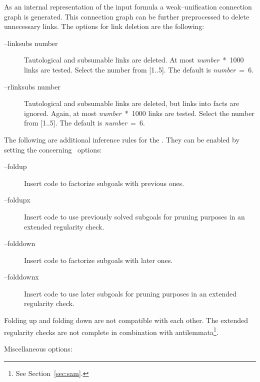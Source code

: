 As an internal representation of the input formula a
weak--unification connection graph  is generated. This
connection graph can be further preprocessed to delete
unnecessary links. The options for link deletion are the
following: 

\begin{description}
      \item[--linksubs \lb number\rb]
           {Tautological and subsumable links are deleted. At  most
            {\it number\/}~*~1000 links are tested. Select the number from
            [1..5]. The default is {\it number\/}~=~6.}
      \item[--rlinksubs \lb number\rb]
           {Tautological and  subsumable  links  are  deleted,  but
            links  into  facts are ignored. Again, at most 
            {\it number\/}~*~1000 links are tested. Select the number from
            [1..5]. The default is {\it number\/}~=~6.} 
\end{description} 

 
The following are additional inference rules for the \SAM. They
can be enabled by setting the concerning \inw\ options:

\begin{description}
      \item[--foldup]
           {Insert code to factorize subgoals with previous ones.}
      \item[--foldupx]
           {Insert code to use previously solved subgoals for pruning
            purposes in an extended regularity check.}
      \item[--folddown]
           {Insert code to factorize subgoals with later ones.}
      \item[--folddownx]
           {Insert code to use later subgoals for pruning  purposes
            in an extended regularity check.} 
\end{description} 

\begin{remark}
Folding up and folding down are  not  compatible  with  each
other.   The  extended regularity checks are not complete in
combination with antilemmata\footnote{See Section~\ref{sec:sam}.}.
\end{remark}

Miscellaneous options:

